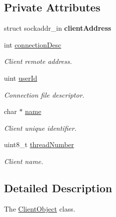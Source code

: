 \subsection*{Private Attributes}
\begin{DoxyCompactItemize}
\item 
\mbox{\label{classClientObject_a9f699539d7adac42a71e4bf6501c0c53}} 
struct sockaddr\+\_\+in {\bfseries client\+Address}
\item 
\mbox{\label{classClientObject_a6592e5413c789857a68b836c7b27c7b1}} 
int \hyperlink{classClientObject_a6592e5413c789857a68b836c7b27c7b1}{connection\+Desc}
\begin{DoxyCompactList}\small\item\em Client remote address. \end{DoxyCompactList}\item 
\mbox{\label{classClientObject_ab4b229b46fe32b699598051074a4f71b}} 
uint \hyperlink{classClientObject_ab4b229b46fe32b699598051074a4f71b}{user\+Id}
\begin{DoxyCompactList}\small\item\em Connection file descriptor. \end{DoxyCompactList}\item 
\mbox{\label{classClientObject_a29fa4c21633a35a7321e255e7ac10dbc}} 
char $\ast$ \hyperlink{classClientObject_a29fa4c21633a35a7321e255e7ac10dbc}{name}
\begin{DoxyCompactList}\small\item\em Client unique identifier. \end{DoxyCompactList}\item 
\mbox{\label{classClientObject_af50b31f834bec1b4673161a1fe910e32}} 
uint8\+\_\+t \hyperlink{classClientObject_af50b31f834bec1b4673161a1fe910e32}{thread\+Number}
\begin{DoxyCompactList}\small\item\em Client name. \end{DoxyCompactList}\end{DoxyCompactItemize}


\subsection{Detailed Description}
The \hyperlink{classClientObject}{Client\+Object} class. 

